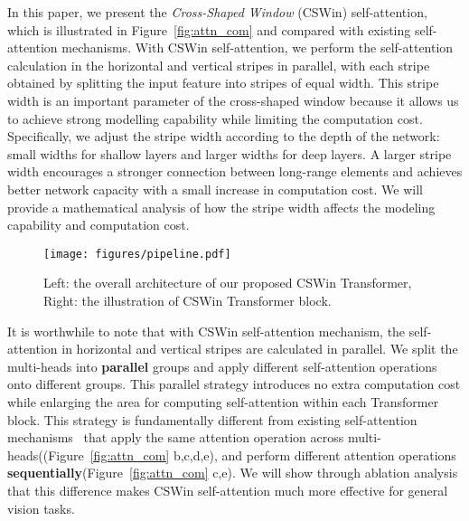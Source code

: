 \documentclass[10pt,twocolumn,letterpaper]{article}
\newcommand{\Fref}[1]{Figure~\ref{#1}}
\begin{document}
In this paper, we present the \emph{Cross-Shaped Window} (CSWin) self-attention, which is illustrated in \Fref{fig:attn_com} and compared with existing self-attention mechanisms. With CSWin self-attention, we perform the self-attention calculation in the horizontal and vertical stripes in parallel, with each stripe obtained by splitting the input feature into stripes of equal width. This stripe width is an important parameter of the cross-shaped window because it allows us to achieve strong modelling capability while limiting the computation cost. Specifically, we adjust the stripe width according to the depth of the network: small widths for shallow layers and larger widths for deep layers. A larger stripe width encourages a stronger connection between long-range elements and achieves better network capacity with a small increase in computation cost. We will provide a mathematical analysis of how the stripe width affects the modeling capability and computation cost.


\begin{figure*}[t]
\centering
\texttt{[image: figures/pipeline.pdf]} 

\caption{Left: the overall architecture of our proposed CSWin Transformer, Right: the illustration of  CSWin Transformer block.}
\label{fig:arch}
\vspace{-6mm}
\end{figure*}


It is worthwhile to note that with CSWin self-attention mechanism, the self-attention in horizontal and vertical stripes are calculated in parallel. We split the multi-heads into \textbf{parallel} groups and apply different self-attention operations onto different groups. This parallel strategy introduces no extra computation cost while enlarging the area for computing self-attention within each Transformer block. This strategy is fundamentally different from existing self-attention mechanisms~\cite{vaswani2017attention, liu2021swin, zhang2021mvit, ho2019axial} that apply the same attention operation across multi-heads((Figure~\ref{fig:attn_com} b,c,d,e), and perform different attention operations \textbf{sequentially}(Figure~\ref{fig:attn_com} c,e). We will show through ablation analysis that this difference makes CSWin self-attention much more effective for general vision tasks. 
\end{document}
